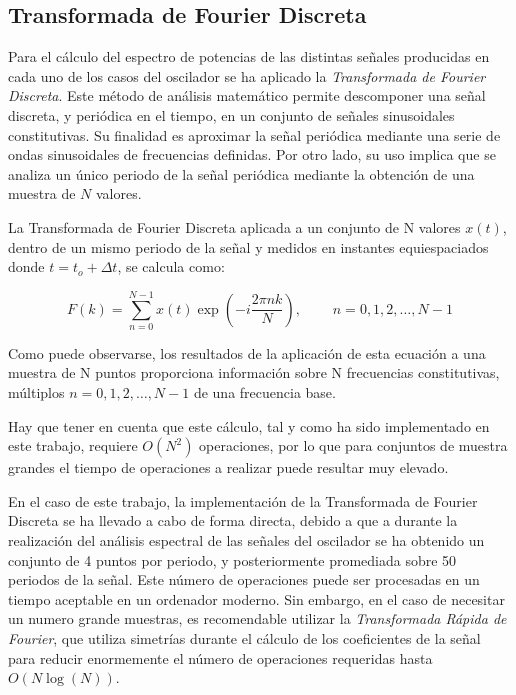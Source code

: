 \documentclass[11pt]{article}
\begin{document}
\subsection{Transformada de Fourier Discreta}
Para el cálculo del espectro de potencias de las distintas señales producidas
en cada uno de los casos del oscilador se ha aplicado la \textit{Transformada de
Fourier Discreta}. Este método de análisis matemático permite descomponer una
señal discreta, y periódica en el tiempo, en un conjunto de señales sinusoidales
constitutivas. Su finalidad es aproximar la señal periódica mediante una serie de
ondas sinusoidales de frecuencias definidas. Por otro lado, su uso implica que
se analiza un único periodo de la señal periódica mediante la obtención de una
muestra de $N$ valores.

La Transformada de Fourier Discreta aplicada a un conjunto de N valores $x(t)$,
dentro de un mismo periodo de la señal y medidos en instantes equiespaciados
donde $t = t_o + \Delta{t}$, se calcula como:

\begin{equation}
	F(k) = \sum\limits_{n=0}^{N-1} x(t) \exp(-i \frac{2\pi{}nk}{N}),~~~~~~~~~~
	n = 0, 1, 2, \ldots, N -1
\end{equation}

Como puede observarse, los resultados de la aplicación de esta ecuación a una
muestra de N puntos proporciona información sobre N frecuencias constitutivas, 
múltiplos $n = 0, 1, 2, \ldots, N -1$ de una frecuencia base.

Hay que tener en cuenta que este cálculo, tal y como ha sido implementado en
este trabajo, requiere $O(N^2)$ operaciones, por lo que para conjuntos de
muestra grandes el tiempo de operaciones a realizar puede resultar muy elevado.

En el caso de este trabajo, la implementación de la Transformada de Fourier
Discreta se ha llevado a cabo de forma directa, debido a que a durante la
realización del análisis espectral de las señales del oscilador se ha obtenido
un conjunto de 4 puntos por periodo, y posteriormente promediada sobre 50
periodos de la señal. Este número de operaciones puede ser procesadas en un
tiempo aceptable en un ordenador moderno. Sin embargo, en el caso de necesitar 
un numero grande muestras, es recomendable utilizar la \textit{Transformada
Rápida de Fourier}, que utiliza simetrías durante el cálculo de los coeficientes
de la señal para reducir enormemente el número de operaciones requeridas hasta
$O(N\log(N))$.
\end{document}
